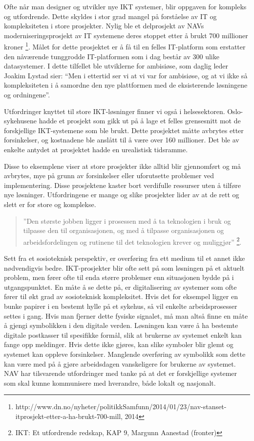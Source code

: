 \documentclass[informationsecurity]{gucmasterproject}
\begin{document}
Ofte når man designer og utvikler nye IKT systemer, blir oppgaven for kompleks og utfordrende. Dette skyldes i stor grad mangel på forståelse av IT og kompleksiteten i store prosjekter. Nylig ble et delprosjekt av NAVs moderniseringsprosjekt av IT systemene deres stoppet etter å brukt 700 millioner kroner \footnote{http://www.dn.no/nyheter/politikkSamfunn/2014/01/23/nav-stanset-itprosjekt-etter-a-ha-brukt-700-mill, 2014}. Målet for dette prosjektet er å få til en felles IT-platform som erstatter den nåværende tunggrodde IT-platformen som i dag består av 300 ulike datasystemer. I dette tilfellet ble utviklerne for ambisiøse, som daglig leder Joakim Lystad sier: “Men i ettertid ser vi at vi var for ambisiøse, og at vi ikke så kompleksiteten i å samordne den nye plattformen med de eksisterende løsningene og ordningene”.

Utfordringer knyttet til store IKT-løsninger finner vi også i helsesektoren. Oslo-sykehusene hadde et prosjekt som gikk ut på å lage et felles grensesnitt mot de forskjellige IKT-systemene som ble brukt. Dette prosjektet måtte avbrytes etter forsinkelser, og kostnadene ble anslått til å være over 160 millioner. Det ble av enkelte antydet at prosjektet hadde en urealistisk tidsramme.

Disse to eksemplene viser at store prosjekter ikke alltid blir gjennomført og må avbrytes, mye på grunn av forsinkelser eller uforutsette problemer ved implementering. Disse prosjektene kaster bort verdifulle ressurser uten å tilføre nye løsninger. Utfordringene er mange og slike prosjekter lider av at de rett og slett er for store og komplekse. 

\begin{quote}
''Den største jobben ligger i prosessen med å ta teknologien i bruk og tilpasse den til organisasjonen, og med å tilpasse organisasjonen og arbeidsfordelingen og rutinene til det teknologien krever og muliggjør'' \footnote{IKT: Et utfordrende redskap, KAP 9, Margunn Aanestad (fronter)}.
\end{quote}

Sett fra et sosioteknisk perspektiv, er overføring fra ett medium til et annet ikke nødvendigvis bedre. IKT-prosjekter blir ofte sett på som løsningen på et aktuelt problem, men fører ofte til enda større problemer enn situasjonen bydde på i utgangspunktet. En måte å se dette på, er digitalisering av systemer som ofte fører til økt grad av sosioteknisk kompleksitet. Hvis det for eksempel ligger en bunke papirer i en bestemt hylle på et sykehus, så vil enkelte arbeidsprosesser settes i gang. Hvis man fjerner dette fysiske signalet, må man altså finne en måte å gjengi symbolikken i den digitale verden. Løsningen kan være å ha bestemte digitale postkasser til spesifikke formål, slik at brukerne av systemet enkelt kan fange opp meldinger. Hvis dette ikke gjøres, kan slike symboler blir glemt og systemet kan oppleve forsinkelser. Manglende overføring av symbolikk som dette kan være med på å gjøre arbeidsdagen vanskeligere for brukerne av systemet. NAV har tilsvarende utfordringer med tanke på at det er forskjellige systemer som skal kunne kommunisere med hverandre, både lokalt og nasjonalt. 
\end{document}
